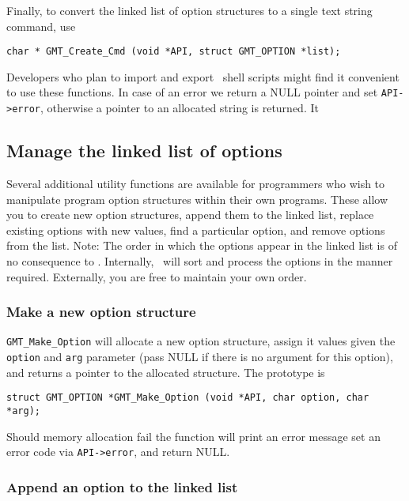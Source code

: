 \documentclass[11pt]{report}
\begin{document}
Finally, to convert the linked list of option structures to a single
text string command, use
\begin{verbatim}
char * GMT_Create_Cmd (void *API, struct GMT_OPTION *list);
\end{verbatim}
Developers who plan to import and export \GMT\ shell scripts might find it
convenient to use these functions.  In case of an error we return a NULL pointer
and set \texttt{API->error}, otherwise a pointer to an allocated string is returned.
It 

\subsection{Manage the linked list of options}

Several additional utility functions are available for programmers who wish to manipulate
program option structures within their own programs.  These allow you to create new
option structures, append them to the linked list, replace existing options with new
values, find a particular option, and remove options from the list.  Note: The
order in which the options appear in the linked list is of no consequence to \GMT.
Internally, \GMT\ will sort and process the options in the manner required.
Externally, you are free to maintain your own order.

\subsubsection{Make a new option structure}

\texttt{GMT\_Make\_Option} will allocate a new option structure, assign it values
given the \texttt{option} and \texttt{arg} parameter (pass NULL if there is no
argument for this option), and returns a pointer
to the allocated structure.  The prototype is

\begin{verbatim}
struct GMT_OPTION *GMT_Make_Option (void *API, char option, char *arg);
\end{verbatim}
Should memory allocation fail the function will print an error message
set an error code via \texttt{API->error}, and return NULL.

\subsubsection{Append an option to the linked list}
\end{document}
